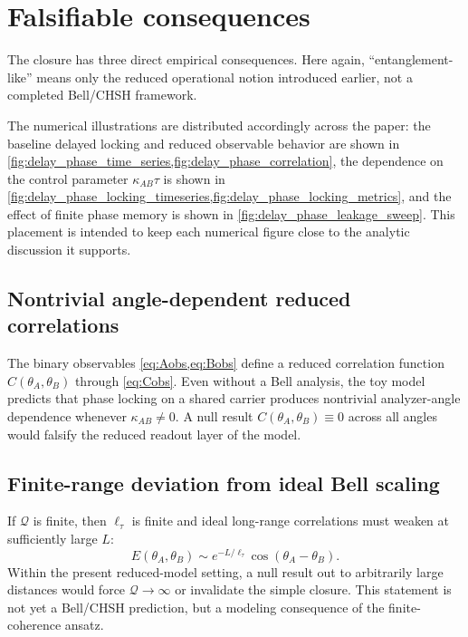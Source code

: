 \documentclass[11pt]{article}
\begin{document}
    \section{Falsifiable consequences}
        
        The closure has three direct empirical consequences.
        Here again, ``entanglement-like'' means only the reduced operational notion introduced earlier, not a completed Bell/CHSH framework.

        The numerical illustrations are distributed accordingly across the paper: the baseline delayed locking and reduced observable behavior are shown in \cref{fig:delay_phase_time_series,fig:delay_phase_correlation}, the dependence on the control parameter \(\kappa_{AB}\tau\) is shown in \cref{fig:delay_phase_locking_timeseries,fig:delay_phase_locking_metrics}, and the effect of finite phase memory is shown in \cref{fig:delay_phase_leakage_sweep}. This placement is intended to keep each numerical figure close to the analytic discussion it supports.

        \subsection{Nontrivial angle-dependent reduced correlations}
            The binary observables \cref{eq:Aobs,eq:Bobs} define a reduced correlation function \(C(\theta_A,\theta_B)\) through \cref{eq:Cobs}. Even without a Bell analysis, the toy model predicts that phase locking on a shared carrier produces nontrivial analyzer-angle dependence whenever \(\kappa_{AB}\neq 0\). A null result \(C(\theta_A,\theta_B)\equiv 0\) across all angles would falsify the reduced readout layer of the model.
        
        \subsection{Finite-range deviation from ideal Bell scaling}
            If \(\mathcal{Q}\) is finite, then \(\ell_\tau\) is finite and ideal long-range correlations must weaken at sufficiently large \(L\):
            \begin{equation}
                E(\theta_A,\theta_B)
                \sim
                e^{-L/\ell_\tau}\cos(\theta_A-\theta_B).
            \end{equation}
            Within the present reduced-model setting, a null result out to arbitrarily large distances would force \(\mathcal{Q}\to\infty\) or invalidate the simple closure. This statement is not yet a Bell/CHSH prediction, but a modeling consequence of the finite-coherence ansatz.
        
\end{document}

